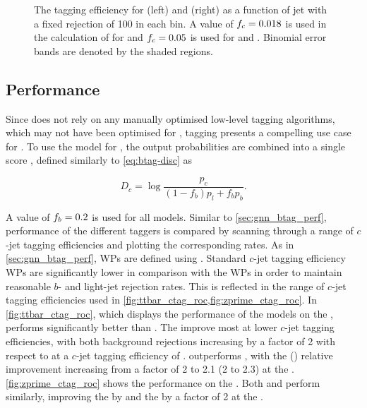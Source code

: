\begin{figure}[!htbp]
\begin{subfigure}[b]{0.48\textwidth}
    \end{subfigure}
    \caption{The \bjet tagging efficiency for \ttbarjets (left) and \Zprimejets (right) as a function of jet \pt with a fixed \ljet rejection of 100 in each bin.
             A value of $f_c = 0.018$ is used in the calculation of \Db for \DLr and $f_c = 0.05$ is used for \GNN and \GNNLep.
             Binomial error bands are denoted by the shaded regions.
             }
    \label{fig:vs_pt_flat_leff}
\end{figure}




\subsection{\texorpdfstring{\ctagging}{c-tagging} Performance}\label{sec:gnn_ctag_perf}

Since \GNN does not rely on any manually optimised low-level tagging algorithms, which may not have been optimised for \ctag, tagging \cjets presents a compelling use case for \GNN.
To use the model for \ctag, the output probabilities are combined into a single score \Dc, defined similarly to \cref{eq:btag-disc} as

\begin{equation}\label{eq:ctag-disc}
    D_c = \log{\frac{p_c}{(1-f_b)p_l + f_b p_b}} .
\end{equation}

A value of $f_b = 0.2$ is used for all models.
Similar to \cref{sec:gnn_btag_perf}, performance of the different taggers is compared by scanning through a range of $c$-jet tagging efficiencies and plotting the corresponding \blrej rates.
As in \cref{sec:gnn_btag_perf}, WPs are defined using \ttbarjets.
Standard $c$-jet tagging efficiency WPs are significantly lower in comparison with the \btag WPs in order to maintain reasonable $b$- and light-jet rejection rates.
This is reflected in the range of $c$-jet tagging efficiencies used in \cref{fig:ttbar_ctag_roc,fig:zprime_ctag_roc}.
In \cref{fig:ttbar_ctag_roc}, which displays the \ctag performance of the models on the \ttbarjets, \GNN performs significantly better than \DLr.
The \blrej improve most at lower $c$-jet tagging efficiencies, with both background rejections increasing by a factor of 2 with respect to \DLr at a $c$-jet tagging efficiency of .
\GNNLep outperforms \GNN, with the \brej (\lrej) relative improvement increasing from a factor of 2 to 2.1 (2 to 2.3) at the .
\cref{fig:zprime_ctag_roc} shows the \ctag performance on the \Zprimejets.
Both \GNN and \GNNLep perform similarly, improving the \brej by  and the \lrej by a factor of 2 at the .

